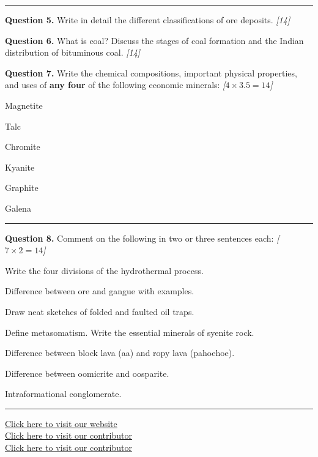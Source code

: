 \documentclass[11pt,a4paper]{article}
\newcommand{\pts}[1]{\hfill   \textit{[#1]}}
\begin{document}
\bigskip


\rule{\linewidth}{0.4pt}\smallskip




\noindent   \textbf{Question 5.} Write in detail the different classifications of ore deposits. \pts{14}

\medskip


\noindent   \textbf{Question 6.} What is coal? Discuss the stages of coal formation and the Indian distribution of bituminous coal. \pts{14}

\medskip


\noindent   \textbf{Question 7.} Write the chemical compositions, important physical properties, and uses of   \textbf{any four} of the following economic minerals: \pts{$4  \times 3.5 = 14$}

\begin{parts}
  \item Magnetite
  \item Talc
  \item Chromite
  \item Kyanite
  \item Graphite
  \item Galena
\end{parts}

\bigskip


\rule{\linewidth}{0.4pt}\smallskip




\noindent   \textbf{Question 8.} Comment on the following in two or three sentences each: \pts{$7  \times 2 = 14$}

\begin{romanparts}
  \item Write the four divisions of the hydrothermal process.
  \item Difference between ore and gangue with examples.
  \item Draw neat sketches of folded and faulted oil traps.
  \item Define metasomatism. Write the essential minerals of syenite rock.
  \item Difference between block lava (aa) and ropy lava (pahoehoe).
  \item Difference between oomicrite and oosparite.
  \item Intraformational conglomerate.
\end{romanparts}

\vfill\rule{\linewidth}{0.4pt}

\begin{center}\small
\href{https://bhu-exam.vercel.app/}{Click here to visit our website}\\[4pt]
\href{https://me-aryan.vercel.app/}{Click here to visit our contributor}\\[4pt]
\href{https://quashan-me.vercel.app/}{Click here to visit our contributor}
\end{center}
\end{document}
